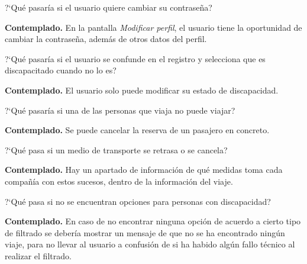 \begin{escenario} %
    \centering
    ?`Qué pasaría si el usuario quiere cambiar su contraseña?

    \begin{solucion}
        \centering
        \textbf{Contemplado.} En la pantalla \textit{Modificar perfil}, el usuario tiene la oportunidad de cambiar la contraseña, además de otros datos del perfil.
    \end{solucion}
\end{escenario}

\begin{escenario} %
    \centering
    ?`Qué pasaría si el usuario se confunde en el registro y selecciona que es discapacitado cuando no lo es?

    \begin{solucion}
        \centering
        \textbf{Contemplado.} El usuario solo puede modificar su estado de discapacidad.

    \end{solucion}
\end{escenario}

\begin{escenario} %
    \centering
    ?`Qué pasaría si una de las personas que viaja no puede viajar?

    \begin{solucion}
        \centering
        \textbf{Contemplado.} Se puede cancelar la reserva de un pasajero en concreto.

    \end{solucion}
\end{escenario}

\begin{escenario} %
    \centering
    ?`Qué pasa si un medio de transporte se retrasa o se cancela?

    \begin{solucion}
        \centering
        \textbf{Contemplado.} Hay un apartado de información de qué medidas toma cada compañía con estos sucesos, dentro de la información del viaje.
    \end{solucion}
\end{escenario}

\begin{escenario} %
    \centering
    ?`Qué pasa si no se encuentran opciones para personas con discapacidad?

    \begin{solucion}
        \centering
        \textbf{Contemplado.} En caso de no encontrar ninguna opción de acuerdo a cierto tipo de filtrado se debería mostrar un mensaje de que no se ha encontrado ningún viaje, para no llevar al usuario a confusión de si ha habido algún fallo técnico al realizar el filtrado.
    \end{solucion}
\end{escenario}

